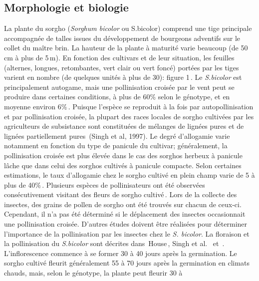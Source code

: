 \documentclass[a4paper,11pt]{article}
\begin{document}
 
\subsection{Morphologie et biologie} La plante du sorgho
(\emph{Sorghum bicolor} ou S.bicolor) comprend une tige principale
accompagnée de talles issues du développement de bourgeons adventifs
sur le collet du maître brin. La hauteur de la plante à maturité varie
beaucoup (de 50\,cm à plus de 5\,m). En fonction des cultivars et de
leur situation, les feuilles (alternes, longues, retombantes, vert
clair ou vert foncé) portées par les tiges varient en nombre (de
quelques unités à plus de 30): figure
1\,\cite{BARRO_KONDOMBO_2010}. Le \emph{S.bicolor} est principalement
autogame, mais une pollinisation croisée par le vent peut se produire
dans certaines conditions, à plus de 60\% selon le génotype, et en
moyenne environ 6\%\,\cite{Ellstrand_1983,
  House85,Pedersen_1998,Schertz_1980}. Puisque l’espèce se reproduit à
la fois par autopollinisation et par pollinisation croisée, la plupart
des races locales de sorgho cultivées par les agriculteurs de
subsistance sont constituées de mélanges de lignées pures et de
lignées partiellement pures\,\cite{SINGH_1997} (Singh et al, 1997). Le
degré d’allogamie varie notamment en fonction du type de panicule du
cultivar; généralement, la pollinisation croisée est plus élevée dans
le cas des sorghos herbeux à panicule lâche que dans celui des sorghos
cultivés à panicule compacte. Selon certaines estimations, le taux
d’allogamie chez le sorgho cultivé en plein champ varie de 5 à plus de
40\%\,\cite{Barnaud_2008, DJE_2004, Doggett_1988, Ellstrand_1983,
  Schmidt_2006}. Plusieurs espèces de pollinisateurs ont été observées
consécutivement visitant des fleurs de sorgho
cultivé\,\cite{Immelman_2000, Schmidt_2006}. Lors de la collecte des
insectes, des grains de pollen de sorgho ont été trouvés sur chacun de
ceux-ci. Cependant, il n’a pas été déterminé si le déplacement des
insectes occasionnait une pollinisation croisée. D’autres études
doivent être réalisées pour déterminer l’importance de la
pollinisation par les insectes chez le \emph{S. bicolor}. La floraison
et la pollinisation du \emph{S.bicolor} sont décrites
dans\,\citeauthor{House85} House\,\citeyear{House85}, Singh et
al.\citeauthor{SINGH_1997} \,\citeyear{SINGH_1997} et
\citeauthor{SRINIVASA_2013}\,\citeyear{SRINIVASA_2013}. L’inflorescence
commence à se former 30 à 40 jours après la germination. Le sorgho
cultivé fleurit généralement 55 à 70 jours après la germination en
climats chauds, mais, selon le génotype, la plante peut fleurir 30 à
\end{document}
